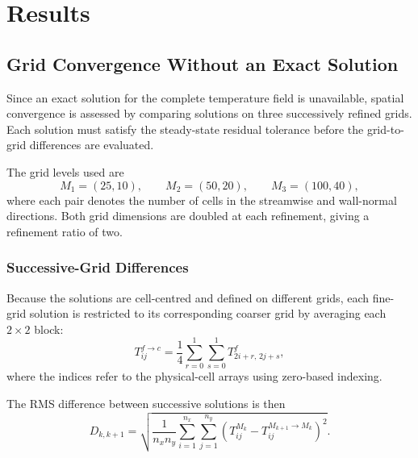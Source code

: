 \newpage

\section{Results}

\subsection{Grid Convergence Without an Exact Solution}
\label{subsec:apf_grid_convergence}

Since an exact solution for the complete temperature field is
unavailable, spatial convergence is assessed by comparing
solutions on three successively refined grids. Each solution
must satisfy the steady-state residual tolerance before the
grid-to-grid differences are evaluated.

The grid levels used are
\begin{equation}
M_1=(25,10),\qquad
M_2=(50,20),\qquad
M_3=(100,40),
\end{equation}
where each pair denotes the number of cells in the streamwise
and wall-normal directions. Both grid dimensions are doubled
at each refinement, giving a refinement ratio of two.

\subsubsection{Successive-Grid Differences}

Because the solutions are cell-centred and defined on different
grids, each fine-grid solution is restricted to its corresponding
coarser grid by averaging each $2\times2$ block:
\begin{equation}
T^{f\rightarrow c}_{ij}
=
\frac{1}{4}
\sum_{r=0}^{1}\sum_{s=0}^{1}
T^f_{2i+r,\,2j+s},
\label{eq:apf_grid_restriction}
\end{equation}
where the indices refer to the physical-cell arrays using
zero-based indexing.

The RMS difference between successive solutions is then
\begin{equation}
D_{k,k+1}
=
\sqrt{
\frac{1}{n_xn_y}
\sum_{i=1}^{n_x}\sum_{j=1}^{n_y}
\left(
T^{M_k}_{ij}
-
T^{M_{k+1}\rightarrow M_k}_{ij}
\right)^2
}.
\label{eq:apf_grid_difference}
\end{equation}

